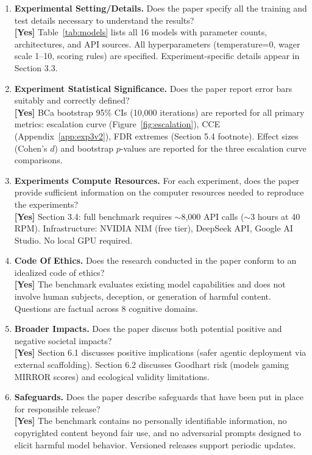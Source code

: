 \documentclass[10pt]{article}
\begin{document}
\begin{enumerate}
\item \textbf{Experimental Setting/Details.} Does the paper specify all the training and test details necessary to understand the results?
\\\textbf{[Yes]} Table~\ref{tab:models} lists all 16 models with parameter counts, architectures, and API sources. All hyperparameters (temperature=0, wager scale 1--10, scoring rules) are specified. Experiment-specific details appear in Section 3.3.

\item \textbf{Experiment Statistical Significance.} Does the paper report error bars suitably and correctly defined?
\\\textbf{[Yes]} BCa bootstrap 95\% CIs (10{,}000 iterations) are reported for all primary metrics: escalation curve (Figure~\ref{fig:escalation}), CCE (Appendix~\ref{app:exp3v2}), FDR extremes (Section 5.4 footnote). Effect sizes (Cohen's $d$) and bootstrap $p$-values are reported for the three escalation curve comparisons.

\item \textbf{Experiments Compute Resources.} For each experiment, does the paper provide sufficient information on the computer resources needed to reproduce the experiments?
\\\textbf{[Yes]} Section 3.4: full benchmark requires $\sim$8{,}000 API calls ($\sim$3 hours at 40 RPM). Infrastructure: NVIDIA NIM (free tier), DeepSeek API, Google AI Studio. No local GPU required.

\item \textbf{Code Of Ethics.} Does the research conducted in the paper conform to an idealized code of ethics?
\\\textbf{[Yes]} The benchmark evaluates existing model capabilities and does not involve human subjects, deception, or generation of harmful content. Questions are factual across 8 cognitive domains.

\item \textbf{Broader Impacts.} Does the paper discuss both potential positive and negative societal impacts?
\\\textbf{[Yes]} Section 6.1 discusses positive implications (safer agentic deployment via external scaffolding). Section 6.2 discusses Goodhart risk (models gaming MIRROR scores) and ecological validity limitations.

\item \textbf{Safeguards.} Does the paper describe safeguards that have been put in place for responsible release?
\\\textbf{[Yes]} The benchmark contains no personally identifiable information, no copyrighted content beyond fair use, and no adversarial prompts designed to elicit harmful model behavior. Versioned releases support periodic updates.


\end{enumerate}
\end{document}
